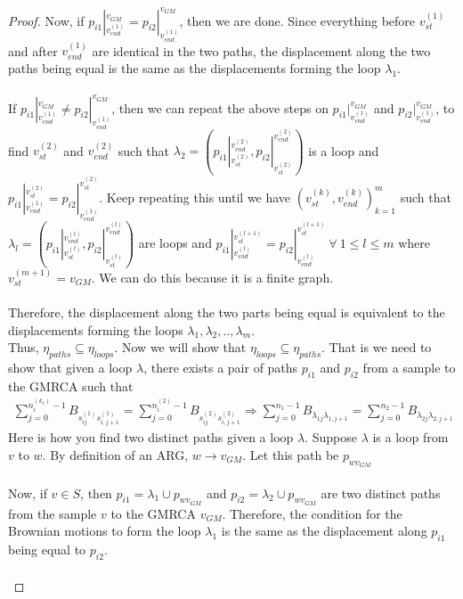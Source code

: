 \begin{proof}
Now, if $p_{i1} |_{v_{end}^{(1)}}^{v_{GM}} = p_{i2} |_{v_{end}^{(1)}}^{v_{GM}} $, then we are done. Since everything before $v_{st}^{(1)}$ and after $v_{end}^{(1)}$ are identical in the two paths, the displacement along the two paths being equal is the same as the displacements forming the loop $\lambda_1$. \\ \\
If $p_{i1} |_{v_{end}^{(1)}}^{v_{GM}} \neq p_{i2} |_{v_{end}^{(1)}}^{v_{GM}} $, then we can repeat the above steps on $p_{i1} |_{v_{end}^{(1)}}^{v_{GM}}$ and $p_{i2} |_{v_{end}^{(1)}}^{v_{GM}}$, to find $v_{st}^{(2)}$ and $v_{end}^{(2)}$ such that $\lambda_2 = ( p_{i1}|_{v_{st}^{(2)}}^{v_{end}^{(2)}}, p_{i2}|_{v_{st}^{(2)}}^{v_{end}^{(2)}})$ is a loop and $p_{i1} |_{v_{end}^{(1)}}^{v_{st}^{(2)}} = p_{i2} |_{v_{end}^{(1)}}^{v_{st}^{(2)}} $. Keep repeating this until we have $(v_{st}^{(k)}, v_{end}^{(k)})_{k=1}^m$ such that $\lambda_l = ( p_{i1}|_{v_{st}^{(l)}}^{v_{end}^{(l)}}, p_{i2}|_{v_{st}^{(l)}}^{v_{end}^{(l)}}) $ are loops and $p_{i1} |_{v_{end}^{(l)}}^{v_{st}^{(l+1)}} = p_{i2} |_{v_{end}^{(l)}}^{v_{st}^{(l+1)}} \ \forall \ 1 \leq l \leq m$ where $v_{st}^{(m+1)} = v_{GM}$. We can do this because it is a finite graph. \\ \\
Therefore, the displacement along the two parts being equal is equivalent to the displacements forming the loops $\lambda_1, \lambda_2,..,\lambda_m$. \\
Thus, $\eta_{paths} \subseteq \eta_{loops}$. \newline
[$\Rightarrow$] Now we will show that $\eta_{loops} \subseteq \eta_{paths}$. That is we need to show that given a loop $\lambda$, there exists a pair of paths $p_{i1}$ and $p_{i2}$ from a sample to the GMRCA such that 
\begin{eqnarray*}
    \displaystyle \sum_{j=0}^{n_i^{(k_1)}-1} B_{s_{ij}^{(1)}  s_{i,j+1}^{(1)} } = \sum_{j=0}^{n_i^{(2)}-1} B_{s_{ij}^{(2)}  s_{i,j+1}^{(2)} } \Rightarrow \sum_{j=0}^{n_1-1} B_{\lambda_{1j} \lambda_{1,j+1} } = \sum_{j=0}^{n_2-1} B_{\lambda_{2j} \lambda_{2,j+1} } 
\end{eqnarray*}
Here is how you find two distinct paths given a loop $\lambda$. Suppose $\lambda$ is a loop from $v$ to $w$. By definition of an ARG, $w \rightarrow v_{GM}$. Let this path be $p_{wv_{GM}}$ \\ \\
Now, if $v \in S$, then $p_{i1} = \lambda_1 \cup p_{wv_{GM}}$ and $p_{i2} = \lambda_2 \cup p_{wv_{GM}}$ are two distinct paths from the sample $v$ to the GMRCA $v_{GM}$. Therefore, the condition for the Brownian motions to form the loop $\lambda_1$ is the same as the displacement along $p_{i1}$ being equal to $p_{i2}$. \\ \\

\end{proof}
